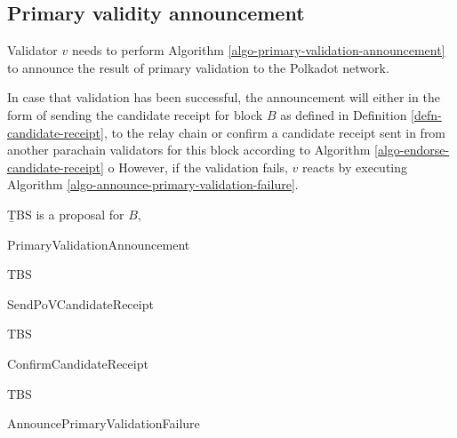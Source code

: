 \subsection{Primary validity announcement}
\label{sect-primary-validaty-announcement}
Validator $v$ needs to perform Algorithm \ref{algo-primary-validation-announcement} to announce the result of primary validation to the Polkadot network.

In case that validation has been successful, the announcement will either in the form of sending the candidate receipt for block $B$ as defined in Definition \ref{defn-candidate-receipt}, to the relay chain or confirm a candidate receipt sent in from another parachain validators for this block according to Algorithm \ref{algo-endorse-candidate-receipt}
o
However, if the validation fails, $v$ reacts by executing Algorithm \ref{algo-announce-primary-validation-failure}.

\begin{definition}
  \label{defn-candidate-receipt}
        {\b TBS} is a proposal for $B$,
\end{definition}

\begin{algorithm}
  \caption[PrimaryValidationAnnouncement]{\sc PrimaryValidationAnnouncement}
  \label{algo-primary-validation-announcement}
  \begin{algorithmic}[1]
    \Require{}
    
    \State TBS
  \end{algorithmic}
\end{algorithm}

\begin{algorithm}
  \caption[]{\sc SendPoVCandidateReceipt}
  \label{algo-send-candidate-receipt}
  \begin{algorithmic}[1]
    \Require{}
    
    \State TBS
  \end{algorithmic}
\end{algorithm}

\begin{algorithm}
  \caption[]{\sc ConfirmCandidateReceipt}
  \label{algo-endorse-candidate-receipt}
  \begin{algorithmic}[1]
    \Require{}
    
    \State TBS
  \end{algorithmic}
\end{algorithm}

\begin{algorithm}
  \caption[]{\sc AnnouncePrimaryValidationFailure}
  \label{algo-announce-primary-validation-failure}
  \begin{algorithmic}[1]
    \Require{}
    
    \State
  \end{algorithmic}
\end{algorithm}

